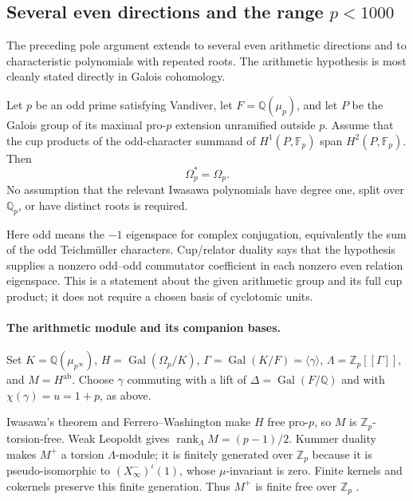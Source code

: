 \subsection{Several even directions and the range \texorpdfstring{$p<1000$}{p<1000}}
\label{sec:multieven-poles}

The preceding pole argument extends to several even arithmetic directions and to characteristic polynomials with repeated roots. The arithmetic hypothesis is most cleanly stated directly in Galois cohomology.

\begin{theorem}\label{thm:pole-general}
Let $p$ be an odd prime satisfying Vandiver, let $F=\mathbb Q(\mu_p)$, and let $P$ be the Galois group of its maximal pro-$p$ extension unramified outside $p$. Assume that the cup products of the odd-character summand of $H^1(P,\mathbb F_p)$ span $H^2(P,\mathbb F_p)$. Then
\[
 \Omega_p^*=\Omega_p.
\]
No assumption that the relevant Iwasawa polynomials have degree one, split over $\mathbb Q_p$, or have distinct roots is required.
\end{theorem}

Here odd means the $-1$ eigenspace for complex conjugation, equivalently the sum of the odd Teichm\"uller characters. Cup/relator duality says that the hypothesis supplies a nonzero odd--odd commutator coefficient in each nonzero even relation eigenspace. This is a statement about the given arithmetic group and its full cup product; it does not require a chosen basis of cyclotomic units.

\paragraph{The arithmetic module and its companion bases.}
Set $K=\mathbb Q(\mu_{p^\infty})$, $H=\operatorname{Gal}(\Omega_p/K)$, $\Gamma=\operatorname{Gal}(K/F)=\langle\gamma\rangle$, $\Lambda=\mathbb Z_p[[\Gamma]]$, and $M=H^{\mathrm{ab}}$. Choose $\gamma$ commuting with a lift of $\Delta=\operatorname{Gal}(F/\mathbb Q)$ and with $\chi(\gamma)=u=1+p$, as above.

Iwasawa's theorem and Ferrero--Washington make $H$ free pro-$p$, so $M$ is $\mathbb Z_p$-torsion-free. Weak Leopoldt gives $\operatorname{rank}_{\Lambda}M=(p-1)/2$. Kummer duality makes $M^+$ a torsion $\Lambda$-module; it is finitely generated over $\mathbb Z_p$ because it is pseudo-isomorphic to $(X_\infty^-)^\iota(1)$, whose $\mu$-invariant is zero. Finite kernels and cokernels preserve this finite generation. Thus $M^+$ is finite free over $\mathbb Z_p$ \cite[Theorem~2]{Iwasawa1981}\cite[Theorems~3.3.3--3.3.4, Proposition~3.4.7, Corollary~3.4.8]{SharifiIwasawaNotes}.

